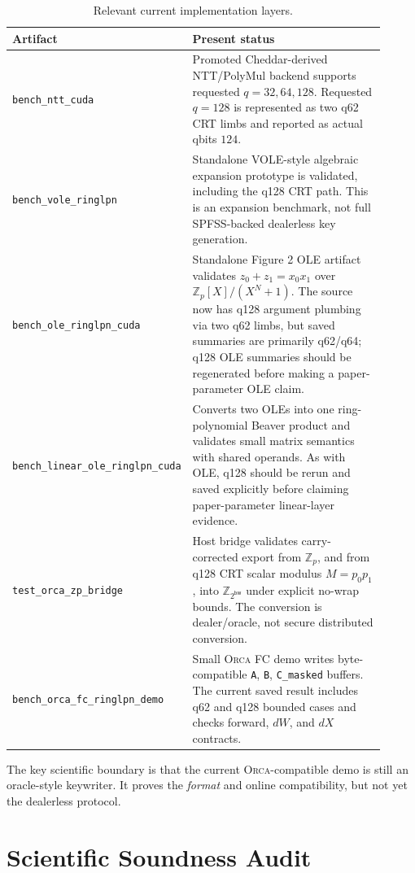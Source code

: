 \documentclass[11pt]{article}
\newcommand{\Z}{\mathbb{Z}}
\newcommand{\modtwo}{\Z_{2^{\mathsf{bw}}}}
\newcommand{\Orca}{\textsc{Orca}}
\begin{document}
\begin{table}[h]
\centering
\small
\begin{tabular}{p{0.29\linewidth}p{0.62\linewidth}}
\toprule
Artifact & Present status \\
\midrule
\texttt{bench\_ntt\_cuda} &
Promoted Cheddar-derived NTT/PolyMul backend supports requested
\(q=32,64,128\). Requested \(q=128\) is represented as two q62 CRT limbs and
reported as actual qbits \(124\). \\
\texttt{bench\_vole\_ringlpn} &
Standalone VOLE-style algebraic expansion prototype is validated, including
the q128 CRT path. This is an expansion benchmark, not full SPFSS-backed
dealerless key generation. \\
\texttt{bench\_ole\_ringlpn\_cuda} &
Standalone Figure 2 OLE artifact validates
\(z_0+z_1=x_0x_1\) over \(\Z_p[X]/(X^N+1)\). The source now has q128
argument plumbing via two q62 limbs, but saved summaries are primarily
q62/q64; q128 OLE summaries should be regenerated before making a
paper-parameter OLE claim. \\
\texttt{bench\_linear\_ole\_ringlpn\_cuda} &
Converts two OLEs into one ring-polynomial Beaver product and validates small
matrix semantics with shared operands. As with OLE, q128 should be rerun and
saved explicitly before claiming paper-parameter linear-layer evidence. \\
\texttt{test\_orca\_zp\_bridge} &
Host bridge validates carry-corrected export from \(\Z_p\), and from q128
CRT scalar modulus \(M=p_0p_1\), into \(\modtwo\) under explicit no-wrap
bounds. The conversion is dealer/oracle, not secure distributed conversion. \\
\texttt{bench\_orca\_fc\_ringlpn\_demo} &
Small \Orca{} FC demo writes byte-compatible \texttt{A}, \texttt{B},
\texttt{C\_masked} buffers. The current saved result includes q62 and q128
bounded cases and checks forward, \(dW\), and \(dX\) contracts. \\
\bottomrule
\end{tabular}
\caption{Relevant current implementation layers.}
\end{table}

The key scientific boundary is that the current \Orca{}-compatible demo is
still an oracle-style keywriter. It proves the \emph{format} and online
compatibility, but not yet the dealerless protocol.

\section{Scientific Soundness Audit}
\end{document}

